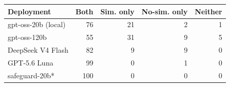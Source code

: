 \begin{tabular}{lrrrr}
\toprule
Deployment & Both & Sim. only & No-sim. only & Neither \\
\midrule
gpt-oss-20b (local) & 76 & 21 & 2 & 1 \\
gpt-oss-120b & 55 & 31 & 9 & 5 \\
DeepSeek V4 Flash & 82 & 9 & 9 & 0 \\
GPT-5.6 Luna & 99 & 0 & 1 & 0 \\
safeguard-20b* & 100 & 0 & 0 & 0 \\
\bottomrule
\end{tabular}
